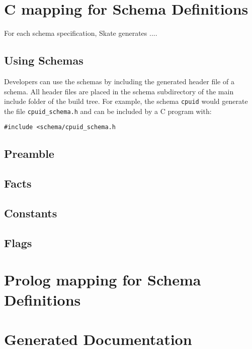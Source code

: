 \documentclass[a4paper,11pt,twoside]{report}
\begin{document}
{{\chapter{C mapping for Schema Definitions}
\label{chap:cmapping}

For each schema specification, Skate generates ....

\section{Using Schemas}

Developers can use the schemas by including the generated header file of a 
schema. All header files are placed in the schema subdirectory of the main 
include folder of the build tree. For example, the 
schema \texttt{cpuid} would generate the file \texttt{cpuid\_schema.h} and can be included by a C program with:


\texttt{\#include <schema/cpuid\_schema.h}

\section{Preamble}

\section{Facts}

\section{Constants}

\section{Flags}


\chapter{Prolog mapping for Schema Definitions}
\label{chap:cmapping}

\chapter{Generated Documentation}
\label{chap:cmapping}

}}
\end{document}
